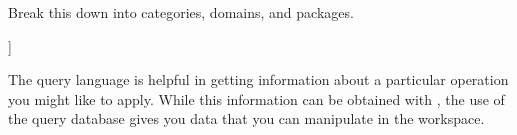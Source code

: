 {{{{{{{\begin{xtc}
\end{xtc}
\begin{xtc}
\begin{xtccomment}
Break this down into categories, domains, and packages.
\end{xtccomment}
\begin{spadsrc}
[o.(kind=k) for k in ["c","d","p"]]
\end{spadsrc}
\begin{TeXOutput}
\begin{fricasmath}{7}
%
\end{fricasmath}
\end{TeXOutput}
\end{xtc}

The query language is helpful in getting information about a
particular operation you might like to apply.
While this information can be obtained with
\Browse{}, the use of the query database gives you data that you
can manipulate in the workspace.

}}}}}}}
